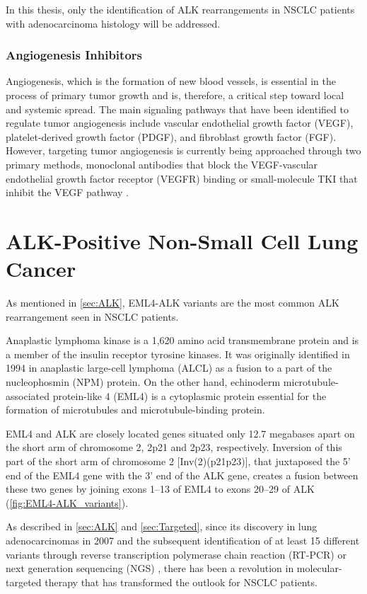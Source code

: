 In this thesis, only the identification of ALK rearrangements in NSCLC patients with adenocarcinoma histology will be addressed.

\subsubsection{Angiogenesis Inhibitors}

Angiogenesis, which is the formation of new blood vessels, is essential in the process of primary tumor growth and is, therefore, a critical step toward local and systemic spread. The main signaling pathways that have been identified to regulate tumor angiogenesis include vascular endothelial growth factor (VEGF), platelet-derived growth factor (PDGF), and fibroblast growth factor (FGF). However, targeting tumor angiogenesis is currently being approached through two primary methods, monoclonal antibodies that block the VEGF-vascular endothelial growth factor receptor (VEGFR) binding or small-molecule TKI that inhibit the VEGF pathway \cite{Angiogenesis}.

\section{ALK-Positive Non-Small Cell Lung Cancer}

As mentioned in \autoref{sec:ALK}, EML4-ALK variants are the most common ALK rearrangement seen in NSCLC patients.

Anaplastic lymphoma kinase is a 1,620 amino acid transmembrane protein and is a member of the insulin receptor tyrosine kinases. It was originally identified in 1994 in anaplastic large-cell lymphoma (ALCL) as a fusion to a part of the nucleophosmin (NPM) protein. On the other hand, echinoderm microtubule-associated protein-like 4 (EML4) is a cytoplasmic protein essential for the formation of microtubules and microtubule-binding protein.

EML4 and ALK are closely located genes situated only 12.7 megabases apart on the short arm of chromosome 2, 2p21 and 2p23, respectively. Inversion of this part of the short arm of chromosome 2 [Inv(2)(p21p23)], that juxtaposed the 5' end of the EML4 gene with the 3' end of the ALK gene, creates a fusion between these two genes by joining exons 1–13 of EML4 to exons 20–29 of ALK (\autoref{fig:EML4-ALK_variants}).

As described in \autoref{sec:ALK} and \autoref{sec:Targeted}, since its discovery in lung adenocarcinomas in 2007 and the subsequent identification of at least 15 different variants through reverse transcription polymerase chain reaction (RT-PCR) or next generation sequencing (NGS) \cite{EML4_ALK_variants}, there has been a revolution in molecular-targeted therapy that has transformed the outlook for NSCLC patients.

